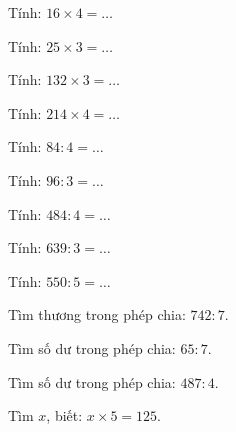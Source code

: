 \begin{ex}
Tính: $16 \times 4 = \dots$
\end{ex}

\begin{ex}
Tính: $25 \times 3 = \dots$
\end{ex}

\begin{ex}
Tính: $132 \times 3 = \dots$
\end{ex}

\begin{ex}
Tính: $214 \times 4 = \dots$
\end{ex}

\begin{ex}
Tính: $84 : 4 = \dots$
\end{ex}

\begin{ex}
Tính: $96 : 3 = \dots$
\end{ex}

\begin{ex}
Tính: $484 : 4 = \dots$
\end{ex}

\begin{ex}
Tính: $639 : 3 = \dots$
\end{ex}

\begin{ex}
Tính: $550 : 5 = \dots$
\end{ex}

\begin{ex}
Tìm thương trong phép chia: $742 : 7$.
\end{ex}

\begin{ex}
Tìm số dư trong phép chia: $65 : 7$.
\end{ex}

\begin{ex}
Tìm số dư trong phép chia: $487 : 4$.
\end{ex}

\begin{ex}
Tìm $x$, biết: $x \times 5 = 125$.
\end{ex}

